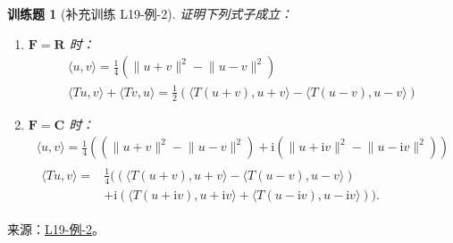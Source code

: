 \documentclass[UTF8,12pt,a4paper,fontset=fandol]{ctexart}
\newtheorem{exercise}{训练题}[section]
\begin{document}
\begin{exercise}[补充训练 L19-例-2]\label{prob:L19-例-2}
证明下列式子成立：
    \begin{enumerate}
        \item $\mathbf{F} = \mathbf{R}$ 时：
              \begin{gather}
                  \label{eq:23:内积和范数的性质1}
                  \langle u, v\rangle = \frac{1}{4}\left( \lVert u + v \rVert^2 - \lVert u - v \rVert^2\right) \\
                  \label{eq:23:内积和范数的性质2}
                  \langle Tu, v\rangle + \langle Tv, u\rangle = \frac{1}{2}\left(\langle T(u + v), u + v\rangle - \langle T(u - v), u - v\rangle\right)
              \end{gather}

        \item $\mathbf{F} = \mathbf{C}$ 时：
              \begin{gather}
                  \label{eq:23:内积和范数的性质3}
                  \langle u, v\rangle = \frac{1}{4}\left((\lVert u + v \rVert^2 - \lVert u - v \rVert^2) + \mathrm{i}(\lVert u + \mathrm{i} v \rVert^2 - \lVert u - \mathrm{i} v \rVert^2)\right) \\
                  \label{eq:23:内积和范数的性质4}
                  \begin{aligned}
                      \langle Tu, v\rangle ={} & \frac{1}{4}  ((\langle T(u + v), u + v\rangle - \langle T(u - v), u - v\rangle)     \\
                                               & + \mathrm{i}(\langle T(u + \mathrm{i} v), u + \mathrm{i} v\rangle + \langle T(u - \mathrm{i} v), u - \mathrm{i} v\rangle)).
                  \end{aligned}
              \end{gather}
    \end{enumerate}
\end{exercise}
\noindent 来源：\href{https://github.com/yhwu-is/Linear-Algebra-Left-Undone/blob/new/%E8%AE%B2%E4%B9%89/%E4%B8%93%E9%A2%98/19%20%E5%86%85%E7%A7%AF%E7%A9%BA%E9%97%B4.tex}{L19-例-2}。
\end{document}
